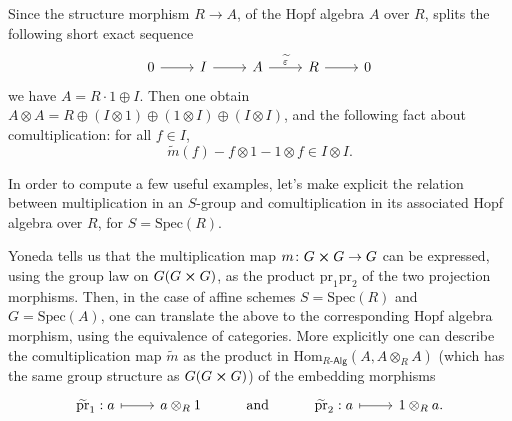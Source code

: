 \documentclass[../Main]{subfiles}
\begin{document}
\begin{defn}
	Since the structure morphism $R \to A$, of the Hopf algebra $A$ over $R$,
	splits the following short exact sequence
	\begin{equation}
	\begin{tikzcd}
		0 \arrow[r, "", rightarrow] &
		I \arrow[r, "", rightarrow] &
		A \arrow[r, "\widetilde{\varepsilon}", rightarrow] &
		R \arrow[r, "", rightarrow] &
		0
	\end{tikzcd}
	\end{equation}
	we have $A = R \cdot 1 \oplus I$.
	Then one obtain $A \otimes A = R \oplus \left( I \otimes 1 \right) \oplus
	\left( 1 \otimes I \right) \oplus \left( I \otimes I \right)$,
	and the following fact about comultiplication:
	for all $f \in I$,
	\begin{equation}
		\widetilde{m}(f) - f \otimes 1 - 1 \otimes f \in I \otimes I
	.\end{equation} 
\end{defn}


In order to compute a few useful examples, let's make explicit the relation between
multiplication in an $S$-group and comultiplication in its associated Hopf algebra over
$R$, for $S = \mathrm{Spec}(R)$.
\begin{rem}\label{rem:ExplicitComult}
	Yoneda tells us that the multiplication map 
	$m\colon G \cross G \to G$ can be expressed, using the group law
	on $G(G \cross G)$, as the product $\mathrm{pr}_1 \mathrm{pr}_2$
	of the two projection morphisms.
	Then, in the case of affine schemes $S = \mathrm{Spec}(R)$
	and $G = \mathrm{Spec}(A)$, one can translate the above to the corresponding
	Hopf algebra morphism, using the equivalence of categories.
	More explicitly one can describe the comultiplication map
	$\widetilde{m}$ as the product in 
	$\mathrm{Hom}_{R\text{-}\mathsf{Alg}} \left( A, A \otimes_R A \right)$ 
	(which has the same group structure as $G(G \cross G)$)
	of the embedding morphisms
	\begin{equation}
	\begin{tikzcd}
		\widetilde{\mathrm{pr}}_1: a \arrow[r, "", mapsto] &
		a \otimes_R 1 &
		\text{and} &
		\widetilde{\mathrm{pr}}_2: a \arrow[r, "", mapsto] &
		1 \otimes_R a
	.\end{tikzcd}
	\end{equation}
\end{rem}
\end{document}
